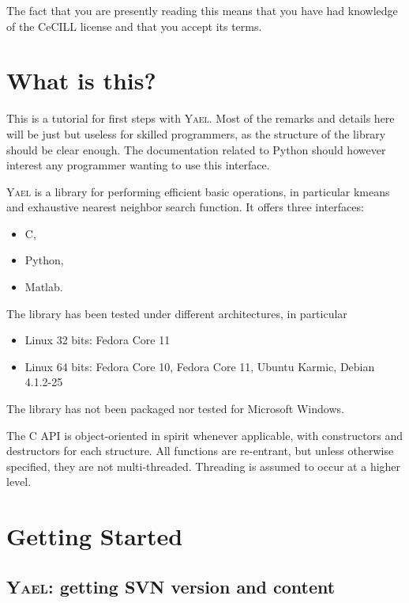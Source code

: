 \documentclass[a4paper,11pt,notitlepage,final,twoside]{report}
\newcommand{\yael}{\textsc{Yael}\xspace}
\begin{document}
The fact that you are presently reading this means that you have had
knowledge of the CeCILL license and that you accept its terms.


\tableofcontents            %


\chapter{What is this?}

This is a tutorial for first steps with \yael. Most of the remarks and details here will be just but useless for skilled programmers, as the structure of the library should be clear enough. The documentation related to Python should however interest any programmer wanting to use this interface. 
\medskip

\yael is a library for performing efficient basic operations, 
in particular kmeans and exhaustive nearest neighbor search function.
It offers three interfaces: 
\begin{itemize}
\item C, 
\item Python, 
\item Matlab.
\end{itemize}

The library has been tested under different architectures, in particular
\begin{itemize}
\item Linux 32 bits: Fedora Core 11
\item Linux 64 bits: Fedora Core 10, Fedora Core 11, Ubuntu Karmic, Debian 4.1.2-25
\end{itemize}
The library has not been packaged nor tested for Microsoft Windows. 

The C API is object-oriented in spirit whenever applicable, with constructors and destructors for each structure. All functions are re-entrant, but unless otherwise specified, they are not multi-threaded. Threading is assumed to occur at a higher level. 

\chapter{Getting Started}
\label{cha:gettingstarted}

\section{\yael: getting SVN version and content}
\end{document}
